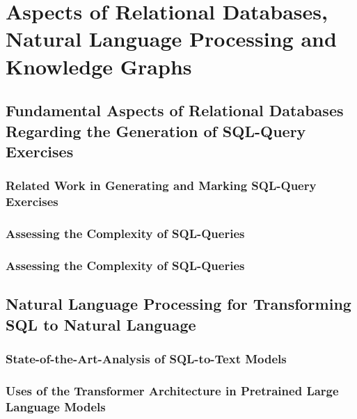 
\chapter{Aspects of Relational Databases, Natural Language Processing and Knowledge Graphs}
\label{ch:theory}

\section{Fundamental Aspects of Relational Databases Regarding the Generation of SQL-Query Exercises}
\label{sec:theory:sql}

\subsection{Related Work in Generating and Marking SQL-Query Exercises}
\label{sec:theory:sql:related}


\subsection{Assessing the Complexity of SQL-Queries}
\label{sec:theory:sql:complexity}


\subsection{Assessing the Complexity of SQL-Queries}
\label{sec:theory:sql:related}

\section{Natural Language Processing for Transforming SQL to Natural Language}
\label{sec:nlp}

\subsection{State-of-the-Art-Analysis of SQL-to-Text Models}
\label{sec:nlp:sota}


\subsection{Uses of the Transformer Architecture in Pretrained Large Language Models}
\label{sec:nlp:transformer}


